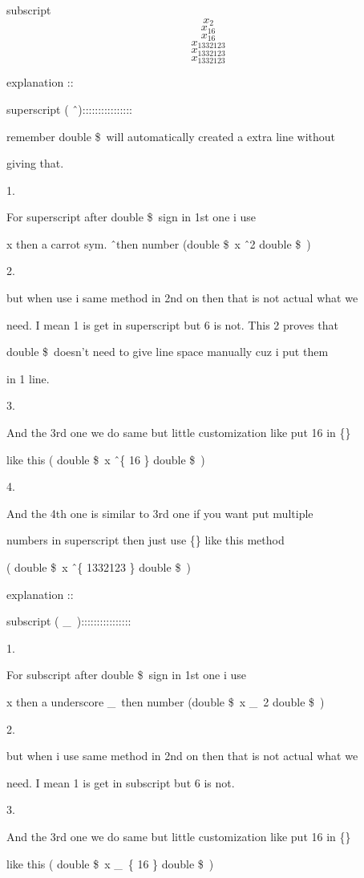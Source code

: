 \documentclass[11pt]{article}
\begin{document}
 subscript
 $$x_2$$ $$x_16$$
 $$x_{16}$$
 $$x_{1{3{3{2{1{2{3}}}}}}}$$
 $$x_{1{3{3{2{1}}2}3}}$$
 $$x_{1332123}$$
 
 explanation ::
 
 superscript ( \^\ )::::::::::::::::
 
 remember double \$\ will automatically created a extra line without
 
 giving that.
 
1.
 
  For superscript after double \$\ sign in 1st one i use 
 
 x then a carrot sym. \^\ then number (double \$\ x \^\ 2 double \$\ ) 
 
2. 
 
 but when use i same method in 2nd on then that is not actual what we
 
 need. I mean 1 is get in superscript but 6 is not. This 2 proves that
 
 double \$\ doesn't need to give line space manually cuz i put them
 
 in 1 line.
 
 3.
 
 And the 3rd one we do same but little customization like put 16 in \{\}
 
 like this ( double \$\ x \^\ \{ 16 \} double \$\ )
 
 
4.
 
 And the 4th one is similar to 3rd one if you want put multiple 
 
 numbers in superscript then just use \{\} like this method
 
 ( double \$\ x \^\ \{ 1332123 \} double \$\ )

\pagebreak
 explanation ::

 subscript ( \_\ )::::::::::::::::
 
 1.
 
  For subscript after double \$\ sign in 1st one i use 
 
 x then a underscore \_\ then number (double \$\ x \_\ 2 double \$\ ) 
 
2. 
 
 but when i use same method in 2nd on then that is not actual what we
 
 need. I mean 1 is get in subscript but 6 is not.
 
 3.
 
  And the 3rd one we do same but little customization like put 16 in \{\}
 
 like this ( double \$\ x \_\ \{ 16 \} double \$\ ) 
 
\end{document}
